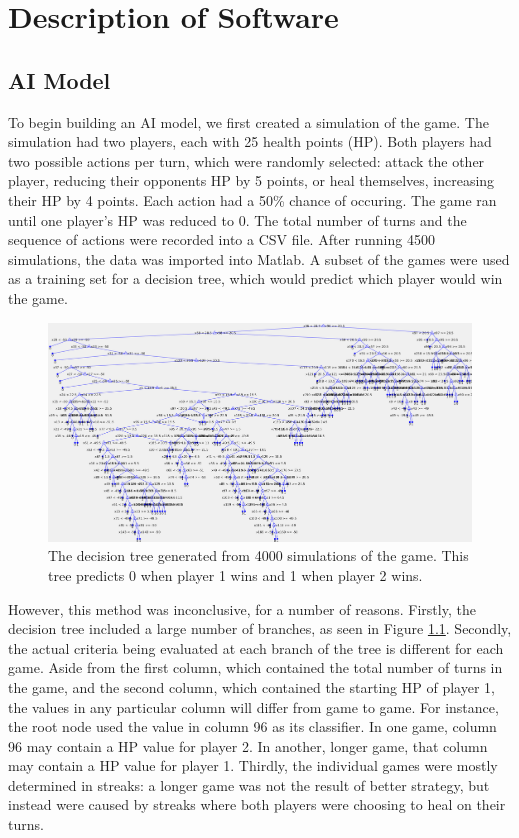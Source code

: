 \chapter{Description of Software}
\section{AI Model}
To begin building an AI model, we first created a simulation of the game. The simulation had two players, each with 25 health points (HP). Both players had two possible actions per turn, which were randomly selected: attack the other player, reducing their opponents HP by 5 points, or heal themselves, increasing their HP by 4 points. Each action had a 50\% chance of occuring. The game ran until one player's HP was reduced to 0. The total number of turns and the sequence of actions were recorded into a CSV file. After running 4500 simulations, the data was imported into Matlab. A subset of the games were used as a training set for a decision tree, which would predict which player would win the game.\\

\begin{figure}[H]
  \centering
  \includegraphics[width=12cm]{figures/firstDecisionTree.png}
  \caption{The decision tree generated from 4000 simulations of the game. This tree predicts 0 when player 1 wins and 1 when player 2 wins.}
  \label{fig:decisionTree1}
\end{figure}

However, this method was inconclusive, for a number of reasons. Firstly, the decision tree included a large number of branches, as seen in Figure \ref{fig:decisionTree1}. Secondly, the actual criteria being evaluated at each branch of the tree is different for each game. Aside from the first column, which contained the total number of turns in the game, and the second column, which contained the starting HP of player 1, the values in any particular column will differ from game to game. For instance, the root node used the value in column 96 as its classifier. In one game, column 96 may contain a HP value for player 2. In another, longer game, that column may contain a HP value for player 1. Thirdly, the individual games were mostly determined in streaks: a longer game was not the result of better strategy, but instead were caused by streaks where both players were choosing to heal on their turns.

